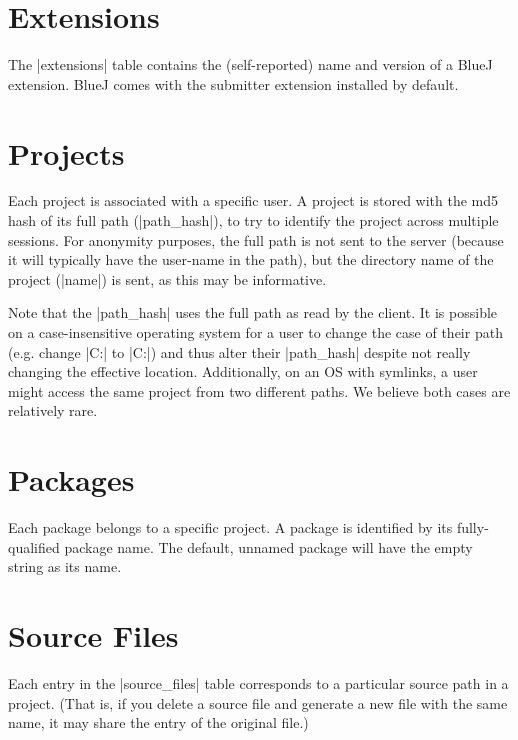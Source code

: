 \documentclass{report}
\begin{document}
\section{Extensions}


The |extensions| table contains the (self-reported) name and version of a
BlueJ extension.  BlueJ comes with the submitter extension installed by default.

\section{Projects}


Each project is associated with a specific user.  A project is stored with the
md5 hash of its full path (|path_hash|), to try to identify the project across multiple
sessions.  For anonymity purposes, the full path is not sent to the server
(because it will typically have the user-name in the path), but the directory
name of the project (|name|) is sent, as this may be informative.

Note that the |path_hash| uses the full path as read by the client.  It is possible on
a case-insensitive operating system for a user to change the case of their path (e.g. change
|C:\BLUEJPROJ{}| to |C:\BlueJproj{}|) and thus alter their |path_hash| despite not
really changing the effective location.  Additionally, on an OS with symlinks, a user might
access the same project from two different paths.  We believe both cases are relatively rare.

\section{Packages}


Each package belongs to a specific project.  A package is identified by its
fully-qualified package name.  The default, unnamed package will have the
empty string as its name.

\section{Source Files}


Each entry in the |source_files| table corresponds to a particular
source path in a project.  (That is, if you delete a source file and
generate a new file with the same name, it may share the entry of the
original file.)
\end{document}
